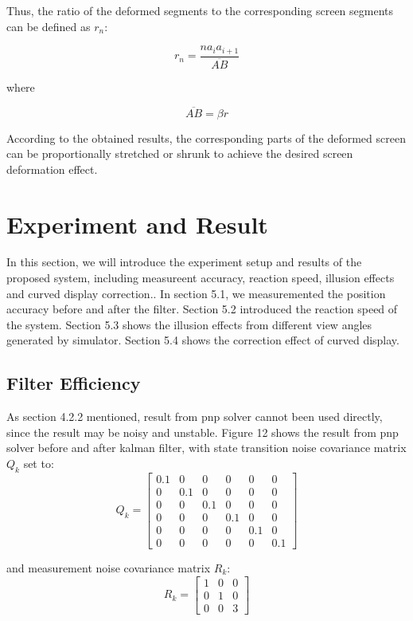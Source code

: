 Thus, the ratio of the deformed segments to the corresponding screen segments can be defined as \( r_n \):

\begin{equation}
r_n = \frac{n a_i a_{i+1}}{\overline{AB}}
\end{equation}

where

\begin{equation}
\overline{AB} = \beta r
\end{equation}

According to the obtained results, the corresponding parts of the deformed screen can be proportionally stretched or shrunk to achieve the desired screen deformation effect.


\section {Experiment and Result}
In this section, we will introduce the experiment setup and results of the proposed system, including measureent accuracy, reaction speed, illusion effects and curved display correction.. In section 5.1, we measuremented the position accuracy before and after the filter. Section 5.2 introduced the reaction speed of the system. Section 5.3 shows the illusion effects from different view angles generated by simulator. Section 5.4 shows the correction effect of curved display.
\subsection{Filter Efficiency}
As section 4.2.2 mentioned, result from pnp solver cannot been used directly, since the result may be noisy and unstable. Figure 12 shows the result from pnp solver before and after kalman filter, with state transition noise covariance matrix $Q_k$ set to:
$$
Q_k = \begin{bmatrix} 0.1 & 0 & 0 & 0 & 0 & 0 \\ 0 & 0.1 & 0 & 0 & 0 & 0 \\ 0 & 0 & 0.1 & 0 & 0 & 0 \\ 0 & 0 & 0 & 0.1 & 0 & 0 \\ 0 & 0 & 0 & 0 & 0.1 & 0 \\ 0 & 0 & 0 & 0 & 0 & 0.1 \end{bmatrix}
$$

and measurement noise covariance matrix $R_k$:
$$
R_k = \begin{bmatrix} 1 & 0 & 0 \\ 0 & 1 & 0 \\ 0 & 0 & 3 \end{bmatrix}
$$

